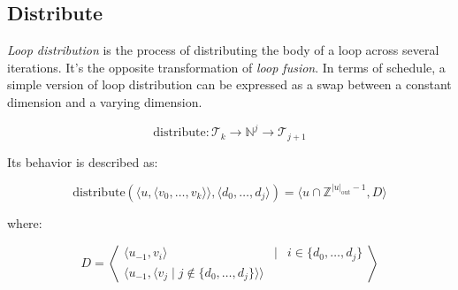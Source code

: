 \documentclass{article}
\begin{document}
\subsection{Distribute}

\emph{Loop distribution} is the process of distributing the body of a loop
across several iterations. It's the opposite transformation of \emph{loop
fusion}. In terms of schedule, a simple version of loop distribution can be
expressed as a swap between a constant dimension and a varying dimension.

\[
    \mathrm{distribute}: \mathcal{T}_k \rightarrow \mathbb{N}^j \rightarrow \mathcal{T}_{j+1}
\]

Its behavior is described as:

\[
    \mathrm{distribute}(\langle  u, \langle v_0, \ldots, v_k\rangle \rangle, \langle d_0, \ldots, d_j\rangle) = \langle u \cap \mathbb{Z}^{|u|_\mathrm{out}-1}, D\rangle
\]

\noindent where:

\[
    D = \left\langle 
    \begin{array}{ccl}
        \langle  u_{-1}, v_i \rangle & \mid & i \in \{ d_0, \ldots, d_j\} \\
        \langle  u_{-1}, \langle  v_j \mid j \not\in \{ d_0, \ldots, d_j\}\rangle \rangle  & & 
    \end{array}
    \right\rangle
\]
\end{document}
